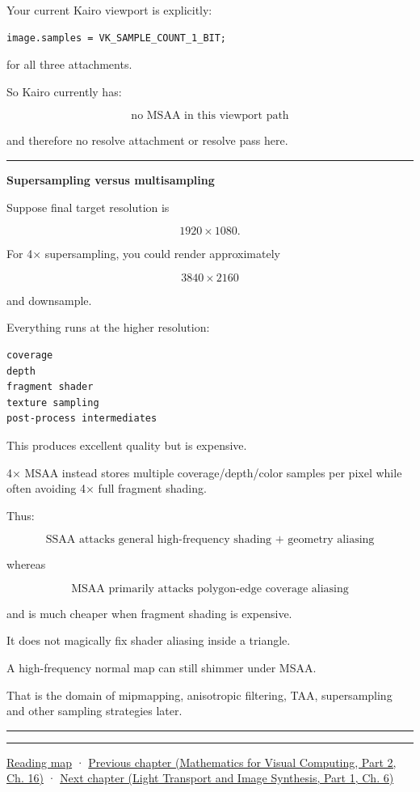 Your current Kairo viewport is explicitly:

\begin{verbatim}
image.samples = VK_SAMPLE_COUNT_1_BIT;
\end{verbatim}

for all three attachments.

So Kairo currently has:

\[
\boxed{\text{no MSAA in this viewport path}}
\]

and therefore no resolve attachment or resolve pass here.

\begin{center}\rule{0.5\linewidth}{0.5pt}\end{center}

\textbf{Supersampling versus multisampling}

Suppose final target resolution is

\[
1920\times1080.
\]

For 4× supersampling, you could render approximately

\[
3840\times2160
\]

and downsample.

Everything runs at the higher resolution:

\begin{verbatim}
coverage
depth
fragment shader
texture sampling
post-process intermediates
\end{verbatim}

This produces excellent quality but is expensive.

4× MSAA instead stores multiple coverage/depth/color samples per pixel while often avoiding 4× full fragment shading.

Thus:

\[
\boxed{
\text{SSAA attacks general high-frequency shading + geometry aliasing}
}
\]

whereas

\[
\boxed{
\text{MSAA primarily attacks polygon-edge coverage aliasing}
}
\]

and is much cheaper when fragment shading is expensive.

It does not magically fix shader aliasing inside a triangle.

A high-frequency normal map can still shimmer under MSAA.

That is the domain of mipmapping, anisotropic filtering, TAA, supersampling and other sampling strategies later.

\begin{center}\rule{0.5\linewidth}{0.5pt}\end{center}

\begin{center}\rule{0.5\linewidth}{0.5pt}\end{center}

\hyperref[volume-reading-map]{Reading map} · \href{../02-Mathematics-for-Visual-Computing-P02/main.pdf\#03-visual-computing-i-ch012-probability-statistics-and-uncertainty}{Previous chapter (Mathematics for Visual Computing, Part 2, Ch. 16)} · \href{../04-Light-Transport-and-Image-Synthesis-P01/main.pdf\#03-visual-computing-i-ch014-transparency-blending-and-visibility}{Next chapter (Light Transport and Image Synthesis, Part 1, Ch. 6)}
